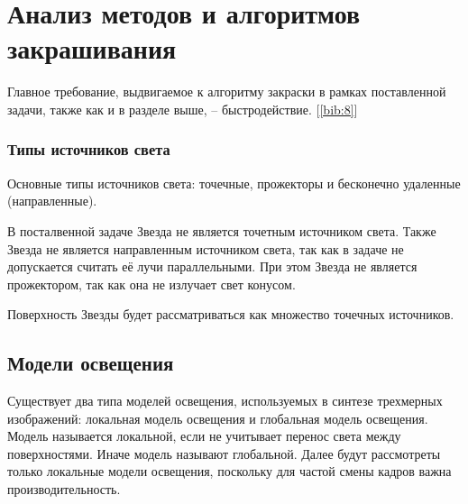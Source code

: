     \section{Анализ методов и алгоритмов закрашивания}
   	\par Главное требование, выдвигаемое к алгоритму закраски в рамках поставленной задачи, также как и в разделе выше, -- быстродействие. [\ref{bib:8}]

   	\subsubsection*{Типы источников света}
   	\par Основные типы источников света: точечные, прожекторы и бесконечно удаленные (направленные).
   	\par В посталвенной задаче Звезда не является точетным источником света. Также Звезда не является направленным источником света, так как в задаче не допускается считать её лучи параллельными. При этом Звезда не является прожектором, так как она не излучает свет конусом.
   	\par Поверхность Звезды будет рассматриваться как множество точечных источников.

   	\subsection*{Модели освещения}
   	\par Существует два типа моделей освещения, используемых в синтезе трехмерных изображений: локальная модель освещения и глобальная модель освещения. Модель называется локальной, если не учитывает перенос света между поверхностями. Иначе модель называют глобальной. Далее будут рассмотреты только локальные модели освещения, поскольку для частой смены кадров важна производительность.

